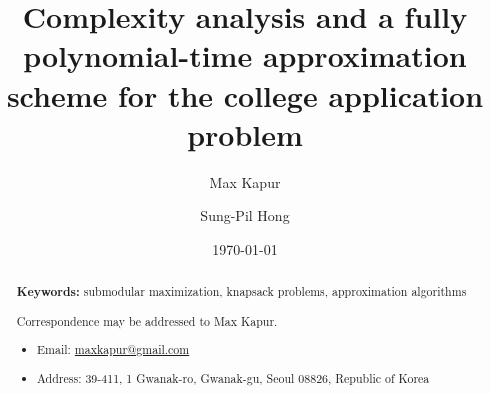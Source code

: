 \documentclass[11pt]{article} %
\title{Complexity analysis and a fully polynomial-time approximation scheme for the college application problem}
\author[1]{Max Kapur}
\author[2]{Sung-Pil Hong}
\affil[1,2]{Department of Industrial Engineering, Seoul National University}
\date{\today}
\theoremstyle{definition}
\begin{document}
\maketitle


\begin{abstract}


\textbf{Keywords:} submodular maximization, knapsack problems, approximation algorithms

\vfill
Correspondence may be addressed to Max Kapur.
\begin{itemize}

\item[] Email: \url{maxkapur@gmail.com}

\item[] Address: 39-411, 1 Gwanak-ro, Gwanak-gu, Seoul 08826, Republic of Korea
\end{itemize}

\end{abstract}


\pagebreak

\tableofcontents






\printbibliography
\end{document}
